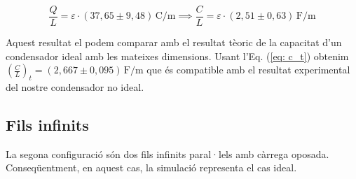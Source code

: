 \documentclass[11pt]{article}
\begin{document}
\[
\frac{Q}{L} = \varepsilon \cdot (37{,}65 \pm 9{,}48)\, \mathrm{C/m} \implies
\boxed{ \frac{C}{L} = \varepsilon \cdot (2{,}51 \pm 0{,}63)\, \mathrm{F/m} }
\]    

Aquest resultat el podem comparar amb el resultat tèoric de la capacitat d'un condensador ideal amb les mateixes dimensions. Usant l'Eq. (\ref{eq: c_t}) obtenim $(\frac{C}{L})_t =(2,667 \pm 0,095)\, \mathrm{F/m}$ que és compatible amb el resultat experimental del nostre condensador no ideal.

\subsection{Fils infinits}\label{sec: fils}
La segona configuració són dos fils infinits paral·lels amb càrrega oposada. Conseqüentment, en aquest cas, la simulació representa el cas ideal.
\end{document}
